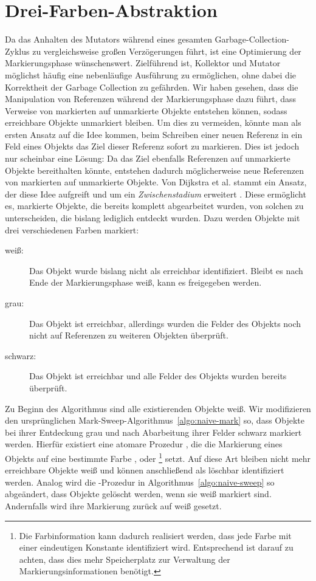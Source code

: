 \section{Drei-Farben-Abstraktion}
\label{sec:tricolor}
Da das Anhalten des Mutators während eines gesamten Garbage-Collection-Zyklus zu vergleichsweise großen Verzögerungen führt, ist eine Optimierung der Markierungsphase wünschenswert.
Zielführend ist, Kollektor und Mutator möglichst häufig eine nebenläufige Ausführung zu ermöglichen, ohne dabei die Korrektheit der Garbage Collection zu gefährden.
Wir haben gesehen, dass die Manipulation von Referenzen während der Markierungsphase dazu führt, dass Verweise von markierten auf unmarkierte Objekte entstehen können, sodass erreichbare Objekte unmarkiert bleiben.
Um dies zu vermeiden, könnte man als ersten Ansatz auf die Idee kommen, beim Schreiben einer neuen Referenz in ein Feld eines Objekts das Ziel dieser Referenz sofort zu markieren.
Dies ist jedoch nur scheinbar eine Lösung:
Da das Ziel ebenfalls Referenzen auf unmarkierte Objekte bereithalten könnte, entstehen dadurch möglicherweise neue Referenzen von markierten auf unmarkierte Objekte.
Von Dijkstra et al. stammt ein Ansatz, der diese Idee aufgreift und um ein \textit{Zwischenstadium} erweitert \cite[S. 969f]{dijkstra1978}.
Diese ermöglicht es, markierte Objekte, die bereits komplett abgearbeitet wurden, von solchen zu unterscheiden, die bislang lediglich entdeckt wurden.
Dazu werden Objekte mit drei verschiedenen Farben markiert:

\begin{description}
	\item[weiß:] Das Objekt wurde bislang nicht als erreichbar identifiziert.
		Bleibt es nach Ende der Markierungsphase weiß, kann es freigegeben werden.
	\item[grau:] Das Objekt ist erreichbar, allerdings wurden die Felder des Objekts noch nicht auf Referenzen zu weiteren Objekten überprüft.
	\item[schwarz:] Das Objekt ist erreichbar und alle Felder des Objekts wurden bereits überprüft.
\end{description}

Zu Beginn des Algorithmus sind alle existierenden Objekte weiß.
Wir modifizieren den ursprünglichen Mark-Sweep-Algorithmus~\ref{algo:naive-mark} so, dass Objekte bei ihrer Entdeckung grau und nach Abarbeitung ihrer Felder schwarz markiert werden.
Hierfür existiert eine atomare Prozedur , die die Markierung eines Objekts auf eine bestimmte Farbe ,  oder \footnote{Die Farbinformation kann dadurch realisiert werden, dass jede Farbe mit einer eindeutigen Konstante identifiziert wird. Entsprechend ist darauf zu achten, dass dies mehr Speicherplatz zur Verwaltung der Markierungsinformationen benötigt.} setzt.
Auf diese Art bleiben nicht mehr erreichbare Objekte weiß und können anschließend als löschbar identifiziert werden.
Analog wird die -Prozedur in Algorithmus~\ref{algo:naive-sweep} so abgeändert, dass Objekte gelöscht werden, wenn sie weiß markiert sind.
Andernfalls wird ihre Markierung zurück auf weiß gesetzt.

